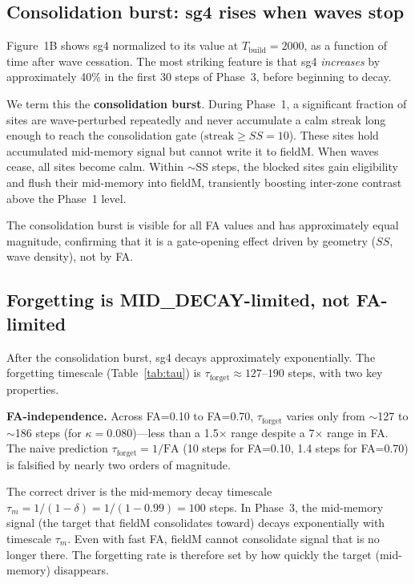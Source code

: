 \documentclass[11pt]{article}
\begin{document}
\subsection{Consolidation burst: sg4 rises when waves stop}

Figure~1B shows sg4 normalized to its value at $T_{\mathrm{build}}=2000$,
as a function of time after wave cessation.
The most striking feature is that sg4 \emph{increases} by approximately 40\%
in the first 30 steps of Phase~3, before beginning to decay.

We term this the \textbf{consolidation burst}.
During Phase~1, a significant fraction of sites are wave-perturbed repeatedly
and never accumulate a calm streak long enough to reach the consolidation gate
($\mathrm{streak} \geq SS = 10$).
These sites hold accumulated mid-memory signal but cannot write it to fieldM.
When waves cease, all sites become calm.
Within $\sim$SS steps, the blocked sites gain eligibility and flush their mid-memory
into fieldM, transiently boosting inter-zone contrast above the Phase~1 level.

The consolidation burst is visible for all FA values and has approximately equal magnitude,
confirming that it is a gate-opening effect driven by geometry ($SS$, wave density),
not by FA.

\subsection{Forgetting is MID\_DECAY-limited, not FA-limited}

After the consolidation burst, sg4 decays approximately exponentially.
The forgetting timescale (Table~\ref{tab:tau}) is $\tau_{\mathrm{forget}} \approx 127$--$190$ steps,
with two key properties.

\textbf{FA-independence.}
Across FA=0.10 to FA=0.70, $\tau_{\mathrm{forget}}$ varies only from $\sim$127 to $\sim$186 steps
(for $\kappa=0.080$)---less than a 1.5× range despite a 7× range in FA.
The naive prediction $\tau_{\mathrm{forget}} = 1/\mathrm{FA}$
(10 steps for FA=0.10, 1.4 steps for FA=0.70) is falsified by nearly two orders of magnitude.

The correct driver is the mid-memory decay timescale
$\tau_m = 1/(1-\delta) = 1/(1-0.99) = 100$ steps.
In Phase~3, the mid-memory signal (the target that fieldM consolidates toward)
decays exponentially with timescale $\tau_m$.
Even with fast FA, fieldM cannot consolidate signal that is no longer there.
The forgetting rate is therefore set by how quickly the target (mid-memory) disappears.
\end{document}
